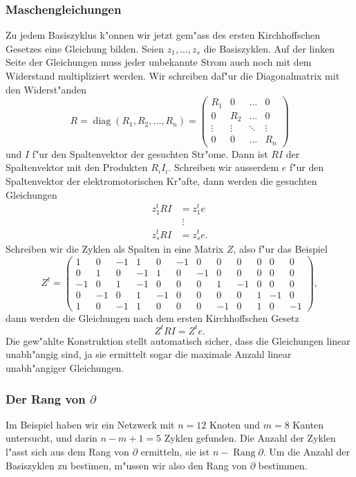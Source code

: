 \subsubsection{Maschengleichungen}
Zu jedem Basiszyklus k"onnen wir jetzt gem"ass des ersten
Kirchhoffschen Gesetzes eine Gleichung bilden.
Seien $z_1,\dots,z_s$ die Basiszyklen.
Auf der linken Seite der Gleichungen muss jeder unbekannte Strom
auch noch mit dem Widerstand multipliziert werden.
Wir schreiben daf"ur die Diagonalmatrix
mit den Widerst"anden
\[
R=
\operatorname{diag}(R_1,R_2,\dots,R_n)=
\begin{pmatrix}
R_1&0&\dots&0\\
0&R_2&\dots&0\\
\vdots&\vdots&\ddots&\vdots\\
0&0&\dots&R_n
\end{pmatrix}
\]
und
$I$ f"ur den Spaltenvektor der gesuchten Str"ome. Dann ist $RI$
der Spaltenvektor mit den Produkten $R_iI_i$.
Schreiben wir ausserdem $e$ f"ur den
Spaltenvektor der elektromotorischen Kr"afte, dann 
werden die gesuchten Gleichungen
\begin{align*}
z_1^tRI&=z_1^te\\
&\;\vdots\\
z_s^tRI&=z_s^te.
\end{align*}
Schreiben wir die Zyklen als Spalten in eine Matrix $Z$, also f"ur das
Beispiel
\[
Z^t=
\begin{pmatrix}
1&0&-1&1&0&-1&0&0&0&0&0&0\\
0&1&0&-1&1&0&-1&0&0&0&0&0\\
-1&0&1&-1&0&0&0&1&-1&0&0&0\\
0&-1&0&1&-1&0&0&0&0&1&-1&0\\
1&0&-1&1&0&0&0&-1&0&1&0&-1
\end{pmatrix},
\]
dann werden die Gleichungen nach dem ersten Kirchhoffschen Gesetz
\[
Z^tRI=Z^te.
\]
Die gew"ahlte Konstruktion stellt automatisch sicher, dass die
Gleichungen linear unabh"angig sind, ja sie ermittelt sogar
die maximale Anzahl linear unabh"angiger Gleichungen.

\subsubsection{Der Rang von $\partial$}
Im Beispiel haben wir ein Netzwerk mit $n=12$ Knoten und $m=8$
Kanten untersucht, und darin $n-m+1=5$ Zyklen gefunden. Die Anzahl
der Zyklen l"asst sich aus dem Rang von $\partial$ ermitteln,
sie ist $n-\operatorname{Rang}\partial$. Um die Anzahl der
Basiszyklen zu bestimen, m"ussen wir also den Rang von $\partial$
bestimmen.

